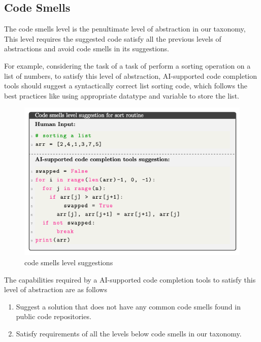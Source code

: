 \subsection{Code Smells}
The code smells level is the penultimate level of abstraction in our taxonomy, This level requires the suggested code satisfy all the previous levels of abstractions and avoid code smells in its suggestions.

For example, considering the task of  a task of perform a sorting operation on a list of numbers, to satisfy this level of abstraction, AI-supported code completion tools should
suggest a syntactically correct list sorting code, which follows the best practices like using appropriate datatype and variable to store the list.

\begin{figure}[hbt!]
    \centering
    \includegraphics[width=\linewidth]{Figures/smells.png}
    \caption{\cct{} code smells level suggestions}
    \label{fig:smells}
\end{figure}

The capabilities required by a AI-supported code completion tools to satisfy this
level of abstraction are as follows
\begin{enumerate}
    \item Suggest a solution that does not have any common code smells found in public code repositories.
    \item Satisfy requirements of all the levels below code smells in our taxonomy.
\end{enumerate}

